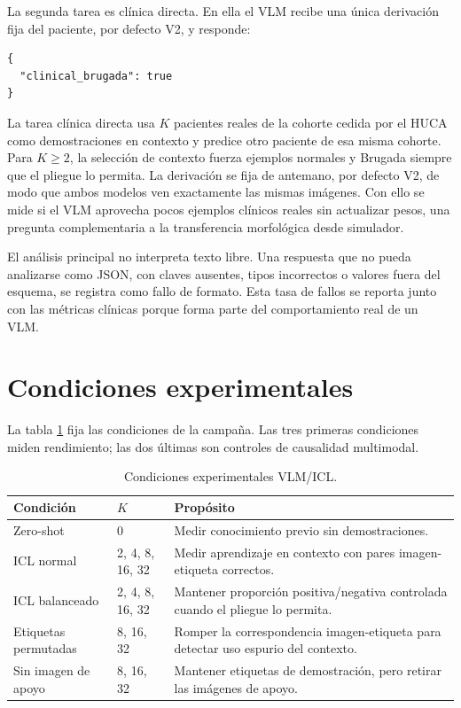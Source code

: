 La segunda tarea es clínica directa. En ella el VLM recibe una única derivación fija del paciente, por defecto V2, y responde:

\begin{lstlisting}
{
  "clinical_brugada": true
}
\end{lstlisting}

La tarea clínica directa usa \(K\) pacientes reales de la cohorte cedida por el HUCA como demostraciones en contexto y predice otro paciente de esa misma cohorte. Para \(K \geq 2\), la selección de contexto fuerza ejemplos normales y Brugada siempre que el pliegue lo permita. La derivación se fija de antemano, por defecto V2, de modo que ambos modelos ven exactamente las mismas imágenes. Con ello se mide si el VLM aprovecha pocos ejemplos clínicos reales sin actualizar pesos, una pregunta complementaria a la transferencia morfológica desde simulador.

El análisis principal no interpreta texto libre. Una respuesta que no pueda analizarse como JSON, con claves ausentes, tipos incorrectos o valores fuera del esquema, se registra como fallo de formato. Esta tasa de fallos se reporta junto con las métricas clínicas porque forma parte del comportamiento real de un VLM.

\section{Condiciones experimentales}

La tabla \ref{tab:vlm_conditions} fija las condiciones de la campaña. Las tres primeras condiciones miden rendimiento; las dos últimas son controles de causalidad multimodal.

\begin{table}[H]
  \centering
  \small
  \begin{tabularx}{\textwidth}{p{3.2cm}p{2.2cm}X}
    \toprule
    Condición & \(K\) & Propósito \\
    \midrule
    Zero-shot & 0 & Medir conocimiento previo sin demostraciones. \\
    ICL normal & 2, 4, 8, 16, 32 & Medir aprendizaje en contexto con pares imagen-etiqueta correctos. \\
    ICL balanceado & 2, 4, 8, 16, 32 & Mantener proporción positiva/negativa controlada cuando el pliegue lo permita. \\
    Etiquetas permutadas & 8, 16, 32 & Romper la correspondencia imagen-etiqueta para detectar uso espurio del contexto. \\
    Sin imagen de apoyo & 8, 16, 32 & Mantener etiquetas de demostración, pero retirar las imágenes de apoyo. \\
    \bottomrule
  \end{tabularx}
  \caption{Condiciones experimentales VLM/ICL.}
  \label{tab:vlm_conditions}
\end{table}

